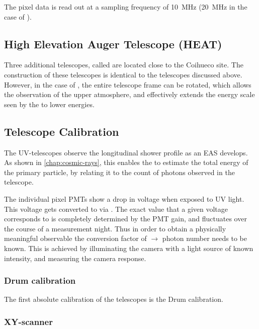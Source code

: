 The pixel data is read out at a sampling frequency of \SI{10}{\mega\hertz} 
(\SI{20}{\mega\hertz} in the case of \HE). 


\subsection{High Elevation Auger Telescope (HEAT)}
\label{ssec:heat}

Three additional telescopes, called \HEs are located close to the Coihueco site.
The construction of these telescopes is identical to the telescopes discussed
above. However, in the case of \HE, the entire telescope frame can be rotated,
which allows the observation of the upper atmosphere, and effectively extends the 
energy scale seen by the \FD to lower energies.


\subsection{Telescope Calibration}
\label{ssec:fd-calibration}

The UV-telescopes observe the longitudinal shower profile as an EAS develops. As 
shown in \autoref{chap:cosmic-rays}, this enables the \FD to estimate the total 
energy of the primary particle, by relating it to the count of photons observed 
in the telescope.

The individual pixel PMTs show a drop  in voltage when exposed to UV light. This
voltage gets converted to \ADC via . The exact \ADC value that a 
given voltage corresponds to is completely determined by the PMT gain, and
fluctuates over the course of a measurement night. Thus in order to obtain a 
physically meaningful observable the conversion factor of \ADC $\rightarrow$ 
photon number needs to be known. This is achieved by illuminating the \FD camera 
with a light source of known intensity, and measuring the camera response. 

\subsubsection{Drum calibration}

The first absolute calibration of the \FD telescopes is the Drum calibration. 


\subsubsection{XY-scanner}



